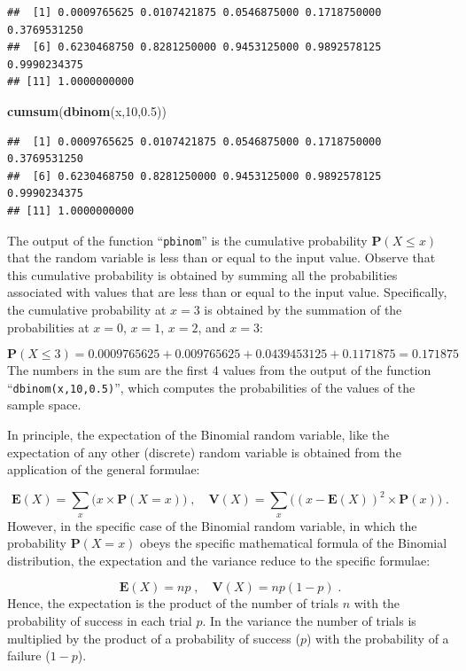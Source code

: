 \documentclass[
]{krantz}
\makeatletter
\newenvironment{Shaded}{\begin{snugshade}}{\end{snugshade}}
\newcommand{\DecValTok}[1]{\textcolor[rgb]{0.00,0.00,0.81}{#1}}
\newcommand{\FloatTok}[1]{\textcolor[rgb]{0.00,0.00,0.81}{#1}}
\newcommand{\KeywordTok}[1]{\textcolor[rgb]{0.13,0.29,0.53}{\textbf{#1}}}
\newcommand{\NormalTok}[1]{#1}
\newcommand{\Expec}{\mathbf{E}}
\newcommand{\Prob}{\mathbf{P}}
\newcommand{\Var}{\mathbf{V}}
\newenvironment{kframe}{%
\medskip{}
\setlength{\fboxsep}{.8em}
 \def\at@end@of@kframe{}%
 \ifinner\ifhmode%
  \def\at@end@of@kframe{\end{minipage}}%
  \begin{minipage}{\columnwidth}%
 \fi\fi%
 \def\FrameCommand##1{\hskip\@totalleftmargin \hskip-\fboxsep
 \colorbox{shadecolor}{##1}\hskip-\fboxsep
     \hskip-\linewidth \hskip-\@totalleftmargin \hskip\columnwidth}%
 \MakeFramed {\advance\hsize-\width
   \@totalleftmargin\z@ \linewidth\hsize
   \@setminipage}}%
 {\par\unskip\endMakeFramed%
 \at@end@of@kframe}
\renewenvironment{Shaded}{\begin{kframe}}{\end{kframe}}
\theoremstyle{definition}
\theoremstyle{definition}
\theoremstyle{definition}
\theoremstyle{remark}
\makeatother
\begin{document}
\begin{verbatim}
##  [1] 0.0009765625 0.0107421875 0.0546875000 0.1718750000 0.3769531250
##  [6] 0.6230468750 0.8281250000 0.9453125000 0.9892578125 0.9990234375
## [11] 1.0000000000
\end{verbatim}

\begin{Shaded}
\begin{Highlighting}[]
\KeywordTok{cumsum}\NormalTok{(}\KeywordTok{dbinom}\NormalTok{(x,}\DecValTok{10}\NormalTok{,}\FloatTok{0.5}\NormalTok{))}
\end{Highlighting}
\end{Shaded}

\begin{verbatim}
##  [1] 0.0009765625 0.0107421875 0.0546875000 0.1718750000 0.3769531250
##  [6] 0.6230468750 0.8281250000 0.9453125000 0.9892578125 0.9990234375
## [11] 1.0000000000
\end{verbatim}

The output of the function ``\texttt{pbinom}'' is the cumulative probability
\(\Prob(X \leq x)\) that the random variable is less than or equal to the
input value. Observe that this cumulative probability is obtained by
summing all the probabilities associated with values that are less than
or equal to the input value. Specifically, the cumulative probability at
\(x=3\) is obtained by the summation of the probabilities at \(x=0\), \(x=1\),
\(x=2\), and \(x=3\):

\[\Prob(X \leq 3) = 0.0009765625 + 0.009765625 + 0.0439453125 + 0.1171875 = 0.171875\]
The numbers in the sum are the first 4 values from the output of the
function ``\texttt{dbinom(x,10,0.5)}'', which computes the probabilities of the
values of the sample space.

In principle, the expectation of the Binomial random variable, like the
expectation of any other (discrete) random variable is obtained from the
application of the general formulae:

\[\Expec(X) = \sum_x \big(x \times \Prob(X = x)\big)\;,\quad \Var(X) = \sum_x\big( (x-\Expec(X))^2 \times \Prob(x)\big)\;.\]
However, in the specific case of the Binomial random variable, in which
the probability \(\Prob(X = x)\) obeys the specific mathematical formula
of the Binomial distribution, the expectation and the variance reduce to
the specific formulae:

\[\Expec(X) = n p\;,\quad \Var(X) = n p(1-p)\;.\]
Hence, the expectation is the product of the number of trials \(n\) with
the probability of success in each trial \(p\). In the variance the number
of trials is multiplied by the product of a probability of success (\(p\))
with the probability of a failure (\(1-p\)).
\end{document}

